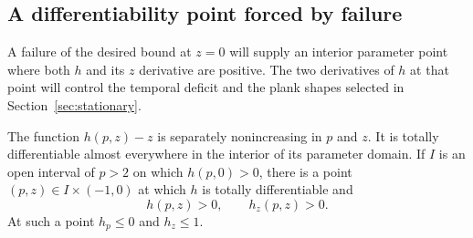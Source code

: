 \subsection{A differentiability point forced by failure}

A failure of the desired bound at $z=0$ will supply an interior parameter
point where both $h$ and its $z$ derivative are positive. The two derivatives
of $h$ at that point will control the temporal deficit and the plank shapes
selected in Section~\ref{sec:stationary}.

\begin{lemma}\label{lem:critical-point}
The function $h(p,z)-z$ is separately nonincreasing in $p$ and $z$.
It is totally differentiable almost everywhere in the interior of its
parameter domain.  If $I$ is an open interval of $p>2$ on which
$h(p,0)>0$, there is a point $(p,z)\in I\times(-1,0)$ at which $h$ is
totally differentiable and
\[
 h(p,z)>0,\qquad h_z(p,z)>0.
\]
At such a point $h_p\le0$ and $h_z\le1$.
\end{lemma}

